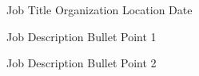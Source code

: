 

\begin{cventries}

  \cventry
    {Job Title} %
    {Organization} %
    {Location} %
    {Date} %
    {
      \begin{cvitems} %
        \item {Job Description Bullet Point 1}
        \item {Job Description Bullet Point 2}
      \end{cvitems}
    }


\end{cventries}
